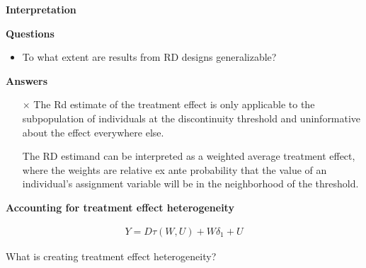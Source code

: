 \begin{frame}\begin{center}
		\LARGE\textbf{Interpretation}
\end{center}\end{frame}
\begin{frame}\textbf{Questions}\vspace{0.3cm}

\begin{itemize}\setlength\itemsep{1em}
\item To what extent are results from RD designs generalizable?
\end{itemize}

\end{frame}
\begin{frame}\textbf{Answers}\vspace{0.3cm}

\begin{itemize}\setlength\itemsep{1em}
\item[$\times$] The Rd estimate of the treatment effect is only applicable to the subpopulation of individuals at the discontinuity threshold and uninformative about the effect everywhere else.

\item[\checkmark] The RD estimand can be interpreted as a weighted average treatment effect, where the weights are relative ex ante probability that the value of an individual's assignment variable will be in the neighborhood of the threshold.
\end{itemize}

\end{frame}
\begin{frame}\textbf{Accounting for treatment effect heterogeneity}\vspace{0.3cm}

\begin{align*}
Y = D \tau(W, U) + W \delta_1 + U
\end{align*}

What is creating treatment effect heterogeneity?

\end{frame}
